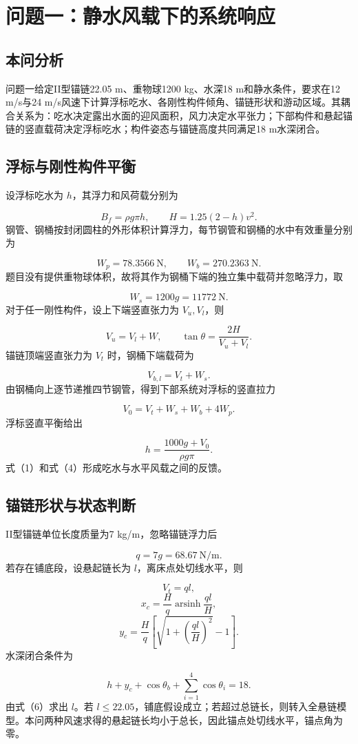 \documentclass[UTF8,zihao=-4,a4paper,fontset=fandol]{ctexart}
\begin{document}
\section{问题一：静水风载下的系统响应}
\subsection{本问分析}
问题一给定II型锚链22.05 m、重物球1200 kg、水深18 m和静水条件，要求在12 m/s与24 m/s风速下计算浮标吃水、各刚性构件倾角、锚链形状和游动区域。其耦合关系为：吃水决定露出水面的迎风面积，风力决定水平张力；下部构件和悬起锚链的竖直载荷决定浮标吃水；构件姿态与锚链高度共同满足18 m水深闭合。

\subsection{浮标与刚性构件平衡}
设浮标吃水为 \(h\)，其浮力和风荷载分别为

\[
B_f=\rho g\pi h,
\qquad
H=1.25(2-h)v^2. \tag{1}
\]
钢管、钢桶按封闭圆柱的外形体积计算浮力，每节钢管和钢桶的水中有效重量分别为

\[
W_p=78.3566\ \mathrm N,
\qquad W_b=270.2363\ \mathrm N.
\]
题目没有提供重物球体积，故将其作为钢桶下端的独立集中载荷并忽略浮力，取

\[
W_s=1200g=11772\ \mathrm N.
\]
对于任一刚性构件，设上下端竖直张力为 \(V_u,V_l\)，则

\[
V_u=V_l+W,
\qquad
\tan\theta=\frac{2H}{V_u+V_l}. \tag{2}
\]
锚链顶端竖直张力为 \(V_t\) 时，钢桶下端载荷为

\[
V_{b,l}=V_t+W_s.
\]
由钢桶向上逐节递推四节钢管，得到下部系统对浮标的竖直拉力

\[
V_0=V_t+W_s+W_b+4W_p. \tag{3}
\]
浮标竖直平衡给出

\[
h=\frac{1000g+V_0}{\rho g\pi}. \tag{4}
\]
式（1）和式（4）形成吃水与水平风载之间的反馈。

\subsection{锚链形状与状态判断}
II型锚链单位长度质量为7 kg/m，忽略锚链浮力后

\[
q=7g=68.67\ \mathrm{N/m}.
\]
若存在铺底段，设悬起链长为 \(l\)，离床点处切线水平，则

\[
V_t=ql,
\]
\[
x_c=\frac{H}{q}\operatorname{arsinh}\frac{ql}{H},
\]
\[
y_c=\frac{H}{q}
\left[
\sqrt{1+\left(\frac{ql}{H}\right)^2}-1
\right]. \tag{5}
\]
水深闭合条件为

\[
h+y_c+\cos\theta_b+
\sum_{i=1}^{4}\cos\theta_i=18. \tag{6}
\]
由式（6）求出 \(l\)。若 \(l\le22.05\)，铺底假设成立；若超过总链长，则转入全悬链模型。本问两种风速求得的悬起链长均小于总长，因此锚点处切线水平，锚点角为零。
\end{document}
